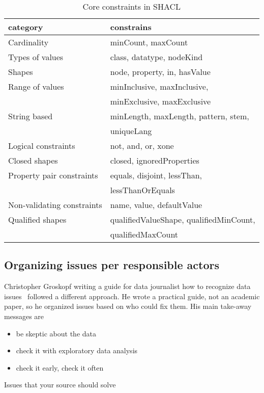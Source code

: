 \begin{table}[h]
\caption{Core constraints in SHACL}
\label{table:shacl}
\centering
\begin{tabular}{l|l}
category & constrains \\
\hline
Cardinality & minCount, maxCount \\
Types of values & class, datatype, nodeKind \\
Shapes & node, property, in, hasValue \\
Range of values & minInclusive, maxInclusive,\\
 &  minExclusive, maxExclusive  \\
String based & minLength, maxLength, pattern, stem,\\
 & uniqueLang \\
Logical constraints & not, and, or, xone \\
Closed shapes & closed, ignoredProperties \\
Property pair constraints & equals, disjoint, lessThan,\\
 & lessThanOrEquals \\
Non-validating constraints & name, value, defaultValue \\
Qualified shapes & qualifiedValueShape, qualifiedMinCount,\\  & qualifiedMaxCount \\
\end{tabular}
\end{table}

\subsection{Organizing issues per responsible actors}

Christopher Groskopf writing a guide for data journalist how to recognize data issues~\cite{groskopf2015} followed a different approach. He wrote a practical guide, not an academic paper, so he organized issues based on who could fix them. His main take-away messages are
\begin{itemize}
 \setlength{\parskip}{0pt}
 \setlength{\itemsep}{0pt plus 1pt}
 \item be skeptic about the data
 \item check it with exploratory data analysis
 \item check it early, check it often
\end{itemize}

Issues that your source should solve

